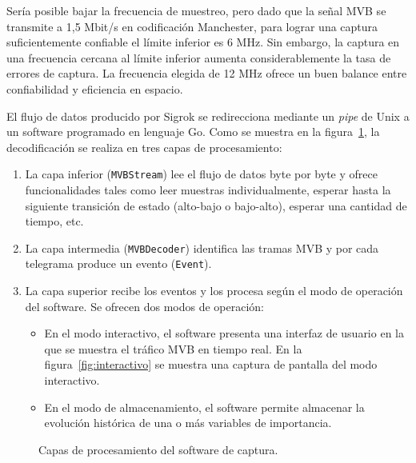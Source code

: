 Sería posible bajar la frecuencia de muestreo, pero dado que la señal MVB se transmite a 1,5 Mbit/s en codificación Manchester, para lograr una captura suficientemente confiable el límite inferior es 6 MHz.
Sin embargo, la captura en una frecuencia cercana al límite inferior aumenta considerablemente la tasa de errores de captura.
La frecuencia elegida de 12 MHz ofrece un buen balance entre confiabilidad y eficiencia en espacio.

El flujo de datos producido por Sigrok se redirecciona mediante un \textit{pipe} de Unix a un software programado en lenguaje Go. Como se muestra en la figura~\ref{fig:capas-software}, la decodificación se realiza en tres capas de procesamiento:

\begin{enumerate}
\item La capa inferior (\texttt{MVBStream}) lee el flujo de datos byte por byte y ofrece funcionalidades tales como leer muestras individualmente, esperar hasta la siguiente transición de estado (alto-bajo o bajo-alto), esperar una cantidad de tiempo, etc.
\item La capa intermedia (\texttt{MVBDecoder}) identifica las tramas MVB y por cada telegrama produce un evento (\texttt{Event}).
\item La capa superior recibe los eventos y los procesa según el modo de operación del software. Se ofrecen dos modos de operación:
    \begin{itemize}
        \item En el modo interactivo, el software presenta una interfaz de usuario en la que se muestra el tráfico MVB en tiempo real. En la figura~\ref{fig:interactivo} se muestra una captura de pantalla del modo interactivo.
        \item En el modo de almacenamiento, el software permite almacenar la evolución histórica de una o más variables de importancia.
    \end{itemize}
\end{enumerate}

\begin{figure}[htbp]
	\centering
    {
        \fontsize{9pt}{9pt}\selectfont
        
    }
	\caption{Capas de procesamiento del software de captura.}
    \label{fig:capas-software}
\end{figure}

